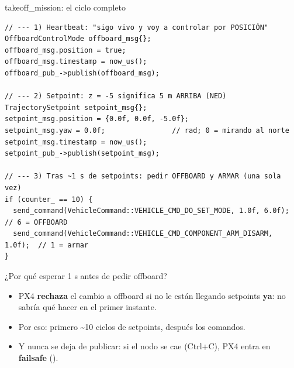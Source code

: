 \begin{frame}[fragile]{takeoff\_mission: el ciclo completo}
  \begin{lstlisting}[style=cpp,caption={takeoff\_mission.cpp, loop() a 10 Hz}]
// --- 1) Heartbeat: "sigo vivo y voy a controlar por POSICIÓN"
OffboardControlMode offboard_msg{};
offboard_msg.position = true;
offboard_msg.timestamp = now_us();
offboard_pub_->publish(offboard_msg);

// --- 2) Setpoint: z = -5 significa 5 m ARRIBA (NED)
TrajectorySetpoint setpoint_msg{};
setpoint_msg.position = {0.0f, 0.0f, -5.0f};
setpoint_msg.yaw = 0.0f;                // rad; 0 = mirando al norte
setpoint_msg.timestamp = now_us();
setpoint_pub_->publish(setpoint_msg);

// --- 3) Tras ~1 s de setpoints: pedir OFFBOARD y ARMAR (una sola vez)
if (counter_ == 10) {
  send_command(VehicleCommand::VEHICLE_CMD_DO_SET_MODE, 1.0f, 6.0f);     // 6 = OFFBOARD
  send_command(VehicleCommand::VEHICLE_CMD_COMPONENT_ARM_DISARM, 1.0f);  // 1 = armar
}
  \end{lstlisting}
\end{frame}

\begin{frame}{¿Por qué esperar 1 s antes de pedir offboard?}
  \centering
  \vspace{0.6em}
  \begin{itemize}\small
    \item PX4 \textbf{rechaza} el cambio a offboard si no le están llegando setpoints \textbf{ya}: no sabría qué
      hacer en el primer instante.
    \item Por eso: primero \textasciitilde10 ciclos de setpoints, después los comandos.
    \item Y nunca se deja de publicar: si el nodo se cae (Ctrl+C), PX4 entra en \textbf{failsafe}
      ().
  \end{itemize}
\end{frame}

